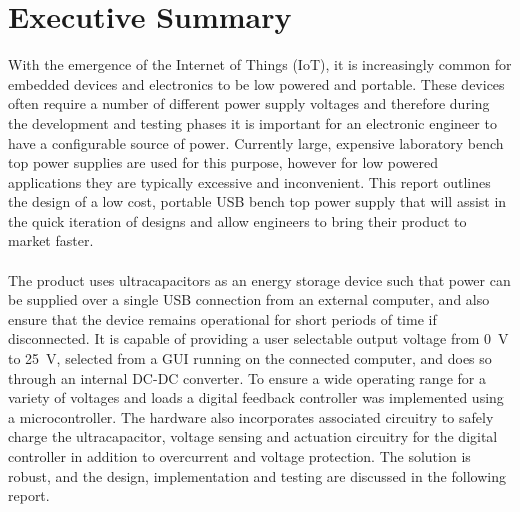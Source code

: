 \section*{Executive Summary}
With the emergence of the Internet of Things (IoT), it is increasingly common for embedded devices and electronics to be low powered and portable. These devices often require a number of different power supply voltages and therefore during the development and testing phases it is important for an electronic engineer to have a configurable source of power. Currently large, expensive laboratory bench top power supplies are used for this purpose, however for low powered applications they are typically excessive and inconvenient. This report outlines the design of a low cost, portable USB bench top power supply that will assist in the quick iteration of designs and allow engineers to bring their product to market faster.
\\ \\
The product uses ultracapacitors as an energy storage device such that power can be supplied over a single USB connection from an external computer, and also ensure that the device remains operational for short periods of time if disconnected. It is capable of providing a user selectable output voltage from \SI{0}{V} to \SI{25}{V}, selected from a GUI running on the connected computer, and does so through an internal DC-DC converter. To ensure a wide operating range for a variety of voltages and loads a digital feedback controller was implemented using a microcontroller. The hardware also incorporates associated circuitry to safely charge the ultracapacitor, voltage sensing and actuation circuitry for the digital controller in addition to overcurrent and voltage protection. The solution is robust, and the design, implementation and testing are discussed in the following report.

